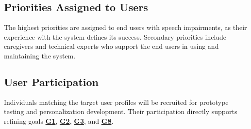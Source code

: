 \documentclass[12pt]{article}
\begin{document}
\subsection{Priorities Assigned to Users}

The highest priorities are assigned to end users with speech impairments, as their experience with the system defines its success. Secondary priorities include caregivers and technical experts who support the end users in using and maintaining the system.

\subsection{User Participation}

Individuals matching the target user profiles will be recruited for prototype testing and personalization development. Their participation directly supports refining goals \textbf{\hyperref[tab:project-goals]{G1}}, \textbf{\hyperref[tab:project-goals]{G2}}, \textbf{\hyperref[tab:project-goals]{G3}}, and \textbf{\hyperref[tab:project-goals]{G8}}.
\end{document}
